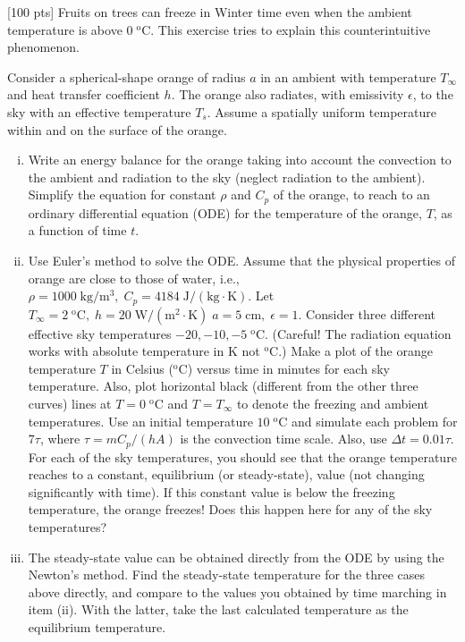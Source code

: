 \documentclass[12pt]{article}
\begin{document}


\begin{ex}
  
  [100 pts] Fruits on trees can freeze in Winter time even when the ambient temperature is above $0\;\mathrm{^oC}$. This exercise tries to explain this counterintuitive phenomenon.

  Consider a spherical-shape orange of radius $a$ in an ambient with temperature $T_{\infty}$ and heat transfer coefficient $h$. The orange also radiates, with emissivity $\epsilon$, to the sky with an effective temperature $T_s$. Assume a spatially uniform temperature within and on the surface of the orange.
  
  \begin{enumerate}[(i)]\setlength{\itemsep}{0pt}
  \item Write an energy balance for the orange taking into account the convection to the ambient and radiation to the sky (neglect radiation to the ambient). Simplify the equation for constant $\rho$ and $C_p$ of the orange, to reach to an ordinary differential equation (ODE) for the temperature of the orange, $T$, as a function of time $t$.
  \item Use Euler's method to solve the ODE. Assume that the physical properties of orange are close to those of water, i.e., $\rho=1000\;\mathrm{kg/m^3},\;C_p=4184\;\mathrm{J/(kg\cdot K)}$. Let $T_{\infty}=2\;\mathrm{^oC},\;h=20\;\mathrm{W/(m^2\cdot K)}\;a=5\;\mathrm{cm},\;\epsilon=1$. Consider three different effective sky temperatures $-20,-10,-5\;\mathrm{^oC}$. (Careful! The radiation equation works with absolute temperature in $\mathrm{K}$ not $\mathrm{^oC}$.) Make a plot of the orange temperature $T$ in Celsius ($\mathrm{^oC}$) versus time in minutes for each sky temperature. Also, plot horizontal black (different from the other three curves) lines at $T=0\;\mathrm{^oC}$ and $T=T_{\infty}$ to denote the freezing and ambient temperatures. Use an initial temperature $10\;\mathrm{^oC}$ and simulate each problem for $7\tau$, where $\tau=mC_p/(hA)$ is the convection time scale. Also, use $\Delta t=0.01\tau$. For each of the sky temperatures, you should see that the orange temperature reaches to a constant, equilibrium (or steady-state), value (not changing significantly with time). If this constant value is below the freezing temperature, the orange freezes! Does this happen here for any of the sky temperatures?
  \item The steady-state value can be obtained directly from the ODE by using the Newton's method. Find the steady-state temperature for the three cases above directly, and compare to the values you obtained by time marching in item (ii). With the latter, take the last calculated temperature as the equilibrium temperature.

\end{enumerate}
\end{ex}
\end{document}
